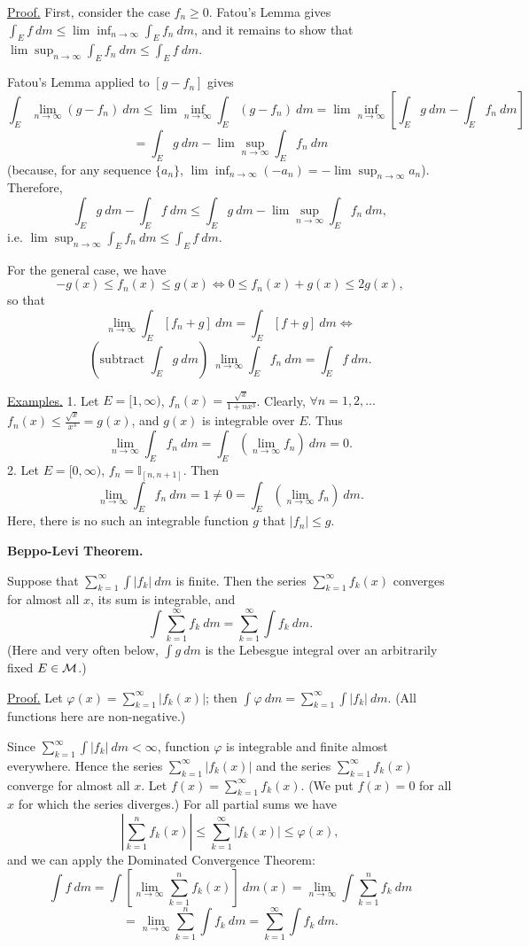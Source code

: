 \documentclass[a4paper,10pt]{article}
\def\II{\mathbb{I}}
\newcommand{\1}[1]{\mathbf{1}_{\{#1\}}}
\begin{document}
\underline{Proof.} First, consider the case $f_n\ge 0$. Fatou's Lemma gives $\int_E f~dm\le\lim \inf_{n\to\infty} \int_E f_n~dm$, and it remains to show that $\lim \sup_{n\to\infty} \int_E f_n~dm\le \int_E f~dm$.

Fatou's Lemma applied to $[g-f_n]$ gives
  $$\int_E\lim_{n\to\infty} (g-f_n)~dm\le \lim \inf_{n\to\infty} \int_E (g-f_n)~dm=\lim \inf_{n\to\infty} \left[\int_E g~dm-\int_E f_n~dm\right]$$
  $$=\int_E g~dm-\lim \sup_{n\to\infty} \int_E f_n~dm$$
(because, for any sequence $\{a_n\}$, $\lim \inf_{n\to\infty} (-a_n)=-\lim \sup_{n\to\infty} a_n$).\\
Therefore,
  $$\int_E g~dm-\int_E f~dm\le \int_E g~dm-\lim \sup_{n\to\infty} \int_E f_n~dm,$$
i.e. $\lim \sup_{n\to\infty} \int_E f_n~dm\le \int_E f~dm$.

For the general case, we have
  $$-g(x)\le f_n(x)\le g(x) \Longleftrightarrow 0\le f_n(x)+g(x)\le 2g(x),$$
so that
  $$\lim_{n\to\infty} \int_E[f_n+g]~dm=\int_E[f+g]~dm\Longleftrightarrow$$
   $$(\mbox{subtract } \int_E g~dm)~ \lim_{n\to\infty} \int_E f_n~dm=\int_E f~dm.$$
\blacksquare \vspace{3mm}

\underline{Examples.} 1. Let $E=[1,\infty)$, $f_n(x)=\frac{\sqrt{x}}{1+nx^3}$. Clearly, $\forall n=1,2,\ldots$ $f_n(x)\le \frac{\sqrt{x}}{x^3}=g(x)$, and $g(x)$ is integrable over $E$. Thus
  $$\lim_{n\to\infty} \int_E f_n~dm=\int_E \left(\lim_{n\to\infty} f_n\right)~dm=0.$$
2. Let $E=[0,\infty)$, $f_n=\II_{[n,n+1]}$. Then
  $$\lim_{n\to\infty} \int_E f_n~dm=1\ne 0=\int_E \left(\lim_{n\to\infty} f_n\right)~dm.$$
Here, there is no such an integrable function  $g$ that $|f_n|\le g$.
\vspace{3mm}

{\bf Beppo-Levi Theorem.}\vspace{3mm}

Suppose that $\displaystyle\sum_{k=1}^\infty \int |f_k|~dm$ is finite. Then the series $\displaystyle\sum_{k=1}^\infty f_k(x)$ converges for almost all $x$, its sum is integrable, and
  $$\int\sum_{k=1}^\infty f_k~dm=\sum_{k=1}^\infty \int f_k~dm.$$
(Here and very often below, $\int g~dm$ is the Lebesgue integral over an arbitrarily fixed $E\in{\cal M}$.)\vspace{3mm}

\underline{Proof.} Let $\varphi(x)=\sum_{k=1}^\infty |f_k(x)|$; then $\int \varphi~dm=\sum_{k=1}^\infty \int |f_k|~dm$. (All functions here are non-negative.)

Since $\sum_{k=1}^\infty \int |f_k|~dm<\infty$, function $\varphi$ is integrable and finite almost everywhere. Hence the series $\sum_{k=1}^\infty |f_k(x)|$ and the series $\sum_{k=1}^\infty f_k(x)$ converge for almost all $x$. Let $f(x)=\sum_{k=1}^\infty f_k(x)$. (We put $f(x)=0$ for all $x$ for which the series diverges.) For all partial sums we have
  $$\left|\sum_{k=1}^n f_k(x)\right|\le \sum_{k=1}^\infty |f_k(x)|\le\varphi(x),$$
and we can apply the Dominated Convergence Theorem:
  $$\int f~dm=\int\left[\lim_{n\to\infty} \sum_{k=1}^n f_k(x)\right] ~dm(x)=\lim_{n\to\infty} \int \sum_{k=1}^n f_k~dm$$
  $$=\lim_{n\to\infty} \sum_{k=1}^n \int f_k~dm=\sum_{k=1}^\infty \int f_k~dm.$$
\blacksquare \vspace{3mm}
\end{document}
